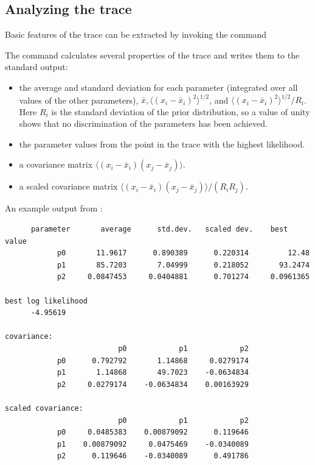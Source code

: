 \subsection{Analyzing the trace}\label{subsec:AnalyzingTheTrace}

Basic features of the trace can be extracted by invoking the command


The command calculates several properties of the trace and writes them to the standard output:
\begin{itemize}\itemsep=0pt
\item the average and standard deviation for each parameter (integrated over all values of the other parameters), $\bar{x},\langle(x_i-\bar{x}_i)^2\rangle^{1/2}$, and $\langle(x_i-\bar{x}_i)^2\rangle^{1/2}/R_i$.
Here $R_i$ is the standard deviation of the prior distribution, so a value of unity shows that no discrimination of the parameters has been achieved.
\item the parameter values from the point in the trace with the highest likelihood.
\item a covariance matrix $\langle (x_i-\bar{x}_i)(x_j-\bar{x}_j)\rangle$.
\item a scaled covariance matrix $\langle (x_i-\bar{x}_i)(x_j-\bar{x}_j)\rangle/(R_iR_j)$.
\end{itemize}

An example output from :
\begin{verbatim}
      parameter       average      std.dev.   scaled dev.    best value
            p0       11.9617      0.890389      0.220314         12.48
            p1       85.7203       7.04999      0.218052       93.2474
            p2     0.0847453     0.0404881      0.701274     0.0961365

best log likelihood
      -4.95619

covariance:
                          p0            p1            p2
            p0      0.792792       1.14868     0.0279174
            p1       1.14868       49.7023    -0.0634834
            p2     0.0279174    -0.0634834    0.00163929

scaled covariance:
                          p0            p1            p2
            p0     0.0485383    0.00879092      0.119646
            p1    0.00879092     0.0475469    -0.0340089
            p2      0.119646    -0.0340089      0.491786
\end{verbatim}

